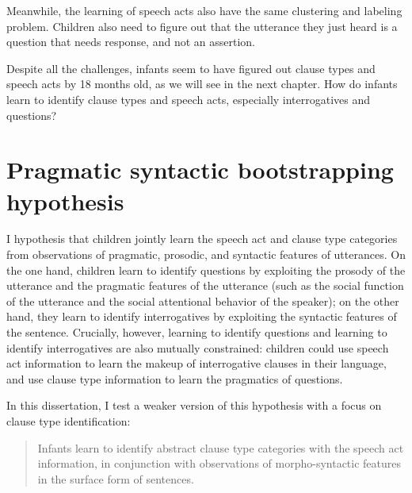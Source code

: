 Meanwhile, the learning of speech acts also have the same clustering and labeling problem. Children also need to figure out that the utterance they just heard is a question that needs response, and not an assertion. 


Despite all the challenges, infants seem to have figured out clause types and speech acts by 18 months old, as we will see in the next chapter. How do infants learn to identify clause types and speech acts, especially interrogatives and questions?

\section{Pragmatic syntactic bootstrapping hypothesis}
\label{sec:intro:prag-syn-bootstrap}

I hypothesis that children jointly learn the speech act and clause type categories from observations of pragmatic, prosodic, and syntactic features of utterances. On the one hand, children learn to identify questions by exploiting the prosody of the utterance and the pragmatic features of the utterance (such as the social function of the utterance and the social attentional behavior of the speaker); on the other hand, they learn to identify interrogatives by exploiting the syntactic features of the sentence. Crucially, however, learning to identify questions and learning to identify interrogatives are also mutually constrained: children could use speech act information to learn the makeup of interrogative clauses in their language, and use clause type information to learn the pragmatics of questions. 

In this dissertation, I test a weaker version of this hypothesis with a focus on clause type identification:

\begin{quote}
Infants learn to identify abstract clause type categories with the speech act information, in conjunction with observations of morpho-syntactic features in the surface form of sentences.
\end{quote}

